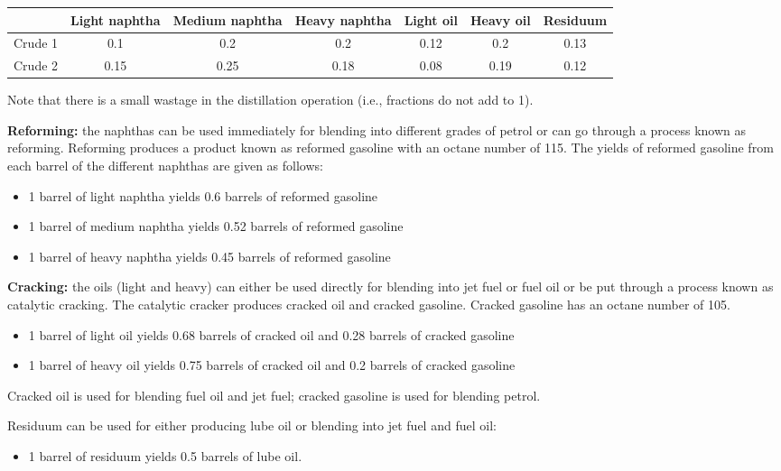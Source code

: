 \documentclass[11pt]{article}
\begin{document}
\begin{tabular}{lcccccc}
    & Light naphtha & Medium naphtha & Heavy naphtha & Light oil & Heavy oil & Residuum \\
    \hline
    Crude 1 & 0.1 & 0.2 & 0.2 & 0.12 & 0.2 & 0.13 \\
    Crude 2 & 0.15 & 0.25 & 0.18 & 0.08 & 0.19 & 0.12 \\
\end{tabular}

Note that there is a small wastage in the distillation operation (i.e., fractions do not add to 1).

\textbf{Reforming:} the naphthas can be used immediately for blending into different grades of petrol or can go through a process known as reforming. Reforming produces a product known as reformed gasoline with an octane number of 115. The yields of reformed gasoline from each barrel of the different naphthas are given as follows:

\begin{itemize}
    \item 1 barrel of light naphtha yields 0.6 barrels of reformed gasoline
    \item 1 barrel of medium naphtha yields 0.52 barrels of reformed gasoline
    \item 1 barrel of heavy naphtha yields 0.45 barrels of reformed gasoline
\end{itemize}

\textbf{Cracking:} the oils (light and heavy) can either be used directly for blending into jet fuel or fuel oil or be put through a process known as catalytic cracking. The catalytic cracker produces cracked oil and cracked gasoline. Cracked gasoline has an octane number of 105.

\begin{itemize}
    \item 1 barrel of light oil yields 0.68 barrels of cracked oil and 0.28 barrels of cracked gasoline
    \item 1 barrel of heavy oil yields 0.75 barrels of cracked oil and 0.2 barrels of cracked gasoline
\end{itemize}

Cracked oil is used for blending fuel oil and jet fuel; cracked gasoline is used for blending petrol.

Residuum can be used for either producing lube oil or blending into jet fuel and fuel oil:
\begin{itemize}
    \item 1 barrel of residuum yields 0.5 barrels of lube oil.
\end{itemize}
\end{document}

